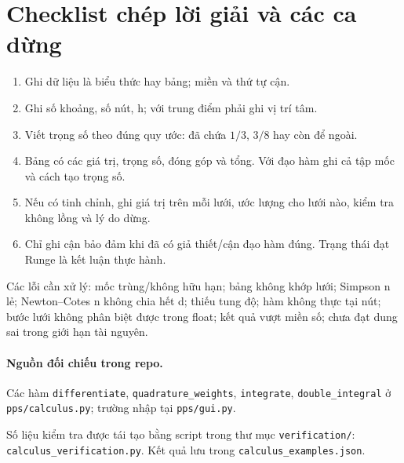 \section{Checklist chép lời giải và các ca dừng}
\begin{enumerate}
\item Ghi dữ liệu là biểu thức hay bảng; miền và thứ tự cận.
\item Ghi số khoảng, số nút, h; với trung điểm phải ghi vị trí tâm.
\item Viết trọng số theo đúng quy ước: đã chứa $1/3$, $3/8$ hay còn để ngoài.
\item Bảng có các giá trị, trọng số, đóng góp và tổng. Với đạo hàm ghi cả tập mốc và cách tạo trọng số.
\item Nếu có tinh chỉnh, ghi giá trị trên mỗi lưới, ước lượng cho lưới nào, kiểm tra không lồng và lý do dừng.
\item Chỉ ghi cận bảo đảm khi đã có giả thiết/cận đạo hàm đúng. Trạng thái đạt Runge là kết luận thực hành.
\end{enumerate}
Các lỗi cần xử lý: mốc trùng/không hữu hạn; bảng không khớp lưới; Simpson n lẻ; Newton--Cotes n không chia hết d; thiếu tung độ; hàm không thực tại nút; bước lưới không phân biệt được trong float; kết quả vượt miền số; chưa đạt dung sai trong giới hạn tài nguyên.

\paragraph{Nguồn đối chiếu trong repo.} Các hàm \texttt{differentiate}, \texttt{quadrature\_weights}, \texttt{integrate}, \texttt{double\_integral} ở \texttt{pps/calculus.py}; trường nhập tại \texttt{pps/gui.py}.

Số liệu kiểm tra được tái tạo bằng script trong thư mục \texttt{verification/}: \texttt{calculus\_verification.py}. Kết quả lưu trong \texttt{calculus\_examples.json}.
